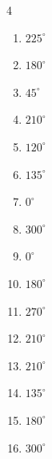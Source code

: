 \begin{multicols}{4}
\begin{enumerate}
  \item $\displaystyle 225^{\circ}$

  \item $\displaystyle 180^{\circ}$
        \phantom{$\displaystyle =\pi$}

\columnbreak %

  \item $\displaystyle 45^{\circ}$

  \item $\displaystyle 210^{\circ}$

  \item $\displaystyle 120^{\circ}$

  \item $\displaystyle 135^{\circ}$

  \item $\displaystyle 0^{\circ}$
        \phantom{$\displaystyle =0$}

  \item $\displaystyle 300^{\circ}$

  \item $\displaystyle 0^{\circ}$
        \phantom{$\displaystyle =0$}

  \item $\displaystyle 180^{\circ}$
        \phantom{$\displaystyle =\pi$}

  \item $\displaystyle 270^{\circ}$

  \item $\displaystyle 210^{\circ}$

  \item $\displaystyle 210^{\circ}$

  \item $\displaystyle 135^{\circ}$

  \item $\displaystyle 180^{\circ}$
        \phantom{$\displaystyle =\pi$}

  \item $\displaystyle 300^{\circ}$


\end{enumerate}
\end{multicols}
